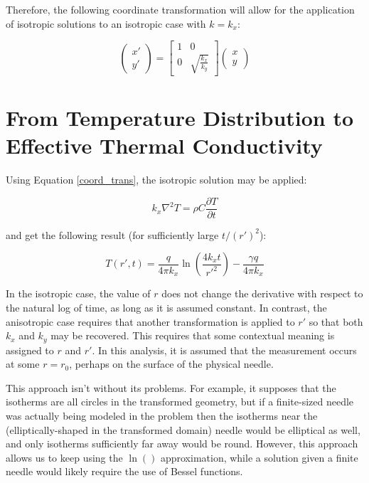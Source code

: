 Therefore, the following coordinate transformation will allow for the application
of isotropic solutions to an isotropic case with \(k = k_x\):

\begin{equation}
    \label{coord_trans}
    \begin{pmatrix}x' \\ y'\end{pmatrix} =
    \begin{bmatrix}1 & 0\\ 0 & \sqrt{\frac{k_x}{k_y}} \end{bmatrix}\begin{pmatrix}x \\ y\end{pmatrix}
\end{equation}

\section{From Temperature Distribution to Effective Thermal Conductivity}

Using Equation \ref{coord_trans}, the isotropic solution may be applied:

\begin{equation}
    k_x \nabla^2 T = \rho C\frac{\partial T}{\partial t}
\end{equation}

and get the following result (for sufficiently large \(t/(r')^2\)):

\begin{equation}
T(r',t) = \frac{q}{4\pi k_x}\ln\left(\frac{4k_xt}{r'^2}\right) - \frac{\gamma q}{4\pi k_x}
\end{equation}

In the isotropic case, the value of \(r\) does not change the derivative with
respect to the natural log of time, as long as it is assumed constant. In contrast, the anisotropic case requires that another transformation is applied
to \(r'\) so that both \(k_x\) and \(k_y\) may be recovered. This requires that
some contextual meaning is assigned to \(r\) and \(r'\). In this analysis, it
is assumed that the measurement occurs at some  \(r = r_{\textrm{0}}\), perhaps
on the surface of the physical needle.

This approach isn't without its problems. For example, it supposes that the
isotherms are all circles in the transformed geometry, but if a finite-sized
needle was actually being modeled in the problem then the isotherms near the
(elliptically-shaped in the transformed domain) needle would be elliptical as
well, and only isotherms sufficiently far away would be round. However, this
approach allows us to keep using the \(\ln()\) approximation, while a solution
given a finite needle would likely require the use of Bessel functions.


